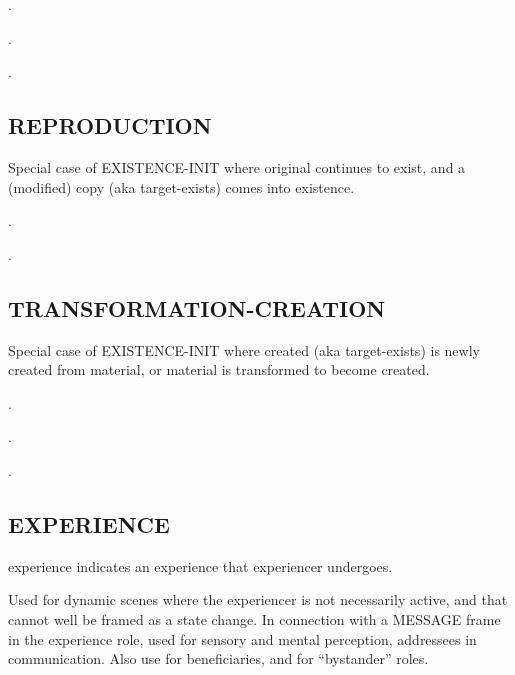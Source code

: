 \documentclass[a4paper]{article}
\newcommand{\fr}[1]{\textsf{#1}}
\newcommand{\rl}[1]{\textsf{#1}}
\begin{document}
\ex.

\ex.

\ex.

\newpage\subsection{ \fr{REPRODUCTION}}
\label{sec:REPRODUCTION}

Special case of \fr{EXISTENCE-INIT} where \rl{original} continues to exist, and
a (modified) \rl{copy} (aka \rl{target-exists}) comes into existence.

\ex.

\ex.

\newpage\subsection{ \fr{TRANSFORMATION-CREATION}}
\label{sec:TRANSFORMATION-CREATION}

Special case of \fr{EXISTENCE-INIT} where \rl{created} (aka \rl{target-exists})
is newly created from \rl{material}, or \rl{material} is transformed to become
\rl{created}.

\ex.

\ex.

\ex.

\newpage\subsection{ \fr{EXPERIENCE}}
\label{sec:EXPERIENCE}

\rl{experience} indicates an experience that \rl{experiencer} undergoes.

Used for dynamic scenes where the \rl{experiencer} is not necessarily active,
and that cannot well be framed as a state change. In connection with a
\fr{MESSAGE} frame in the \rl{experience} role, used for sensory and mental
perception, addressees in communication. Also use for beneficiaries, and for
``bystander'' roles.
\end{document}
